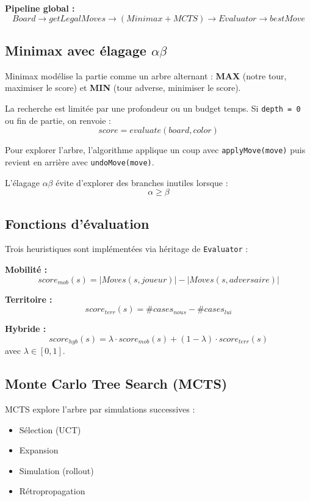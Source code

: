 \documentclass[a4paper]{article}
\begin{document}
\textbf{Pipeline global :}
\[
Board \rightarrow getLegalMoves \rightarrow (Minimax + MCTS) \rightarrow Evaluator \rightarrow bestMove
\]

\subsection{Minimax avec élagage $\alpha\beta$}

Minimax modélise la partie comme un arbre alternant :
\textbf{MAX} (notre tour, maximiser le score) et \textbf{MIN} (tour adverse, minimiser le score).

La recherche est limitée par une profondeur ou un budget temps.  
Si \texttt{depth = 0} ou fin de partie, on renvoie :
\[
score = evaluate(board, color)
\]

Pour explorer l’arbre, l’algorithme applique un coup avec \texttt{applyMove(move)} puis revient en arrière avec \texttt{undoMove(move)}.

L’élagage $\alpha\beta$ évite d’explorer des branches inutiles lorsque :
\[
\alpha \geq \beta
\]

\subsection{Fonctions d’évaluation}

Trois heuristiques sont implémentées via héritage de \texttt{Evaluator} :

\textbf{Mobilité :}
\[
score_{mob}(s) = |Moves(s,joueur)| - |Moves(s,adversaire)|
\]

\textbf{Territoire :}
\[
score_{terr}(s) = \#cases_{nous} - \#cases_{lui}
\]

\textbf{Hybride :}
\[
score_{hyb}(s) = \lambda \cdot score_{mob}(s) + (1-\lambda)\cdot score_{terr}(s)
\]
avec $\lambda \in [0,1]$.

\subsection{Monte Carlo Tree Search (MCTS)}

MCTS \cite{browne2012mcts} explore l’arbre par simulations successives :

\begin{itemize}
  \item Sélection (UCT)
  \item Expansion
  \item Simulation (rollout)
  \item Rétropropagation
\end{itemize}
\end{document}
